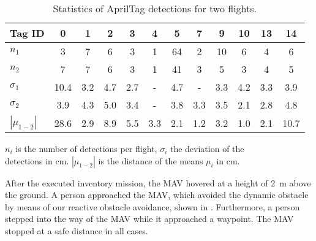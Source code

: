 \begin{table}[t]
  \caption{Statistics of AprilTag detections for two flights. }
\small
 \setlength{\tabcolsep}{1.5mm}
  \vspace{-1ex}
\centering
  \begin{tabular}{@{}l@{\hspace{1pt}}ccccccccccc@{}}
  \toprule
  Tag ID               & 0              & 1                      & 2                       & 3                      & 4                       & 5                      & 7                      & 9                      & 10                     & 13                     & 14\\
  \midrule
  $n_{1}$              & 3              & 7                      & 6                       & 3                      & 1                       & 64                     & 2                      & 10                     & 6                      & 4                      & 6\\
  $n_{2}$              & 7              & 7                      & 6                       & 3                      & 1                       & 41                     & 3                      & 5                      & 3                      & 4                      & 5\\
  \midrule
  $\sigma_{1}$    & 10.4           & 3.2 & 4.7  & 2.7 & -                       & 4.7 & -                      & 3.3 & 4.2 & 3.3 & \phantom{0}3.9\\
  $\sigma_{2}$    & \phantom{0}3.9 & 4.3 & 5.0  & 3.4 & -                       & 3.8 & 3.3 & 3.5 & 2.1 & 2.8 & \phantom{0}4.8\\
  $|\mu_{1-2}|$  & 28.6           & 2.9 & 8.9  & 5.5 & 3.3  & 2.1 & 1.2 & 3.2 & 1.0 & 2.1 & 10.7\\
  \bottomrule    
\end{tabular}
\vspace{0.5ex}
\footnotesize 
   \rule[-.3\baselineskip]{0pt}{\baselineskip} \hspace*{-2ex} $n_i$ is the number of detections per flight, $\sigma_i$ the deviation of the\\ 
    detections in cm. $|\mu_{1-2}|$ is the distance of the means $\mu_i$ in cm.
  \label{tab:results}
\end{table}

After the executed inventory mission, the MAV hovered at a height of \SI{2}{\meter} above the ground.
A person approached the MAV, which avoided the dynamic obstacle by means of our reactive obstacle avoidance, shown in .
Furthermore, a person stepped into the way of the MAV while it approached a waypoint.
The MAV stopped at a safe distance in all cases.

